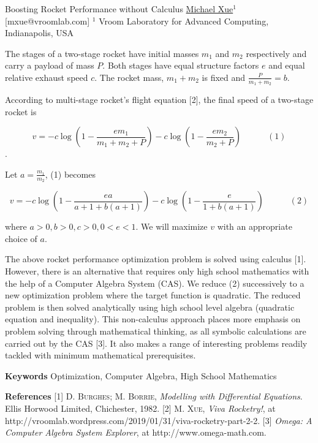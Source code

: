 


\begin{abstract_online}{Boosting Rocket Performance without Calculus}{%
        \underline{Michael Xue}$^{1}$}{[mxue@vroomlab.com]
        }{%
        $^1$ Vroom Laboratory for Advanced Computing, Indianapolis, USA\newline{}}
    
The stages of a two-stage rocket have initial masses $m_1$ and $m_2$ respectively and carry a payload
of mass $P$. Both stages have equal structure factors $e$ and equal relative exhaust speed $c$. 
The rocket mass, $m_1 + m_2$ is fixed and $\frac{P}{m_1+m_2}=b$.

According to multi-stage rocket's flight equation [2], the final speed of a two-stage rocket is

\[v=-c\log(1-\frac{em_1}{m_1+m_2+P})-c\log(1-\frac{em_2}{m_2+P})\quad\quad\quad(1)\].

Let $a=\frac{m_1}{m_2}$, (1) becomes

\[v = -c \log(1-\frac{ea}{a+1+b(a+1)})-c \log(1-\frac{e}{1+b(a+1)})\quad\quad\quad(2)\] 

where $a>0, b>0, c>0, 0<e<1$. We will maximize $v$ with an appropriate choice of $a$. \newline{}

The above rocket performance optimization problem is solved using calculus [1]. 
However, there is an alternative that requires only high school mathematics with the help of a 
Computer Algebra System (CAS). We reduce (2) successively to a new optimization problem 
where the target function is quadratic. The reduced problem is then solved analytically using 
high school level algebra (quadratic equation and inequality). This non-calculus approach places 
more emphasis on problem solving through mathematical thinking, as all symbolic calculations are 
carried out by the CAS [3]. It also makes a range of interesting problems readily tackled with 
minimum mathematical prerequisites.

\textbf{Keywords} \newline{} Optimization, Computer Algebra, High School Mathematics

\textbf{References} \newline{}
[1] \textsc{D. Burghes; M. Borrie}, \emph{Modelling with Differential Equations}. Ellis Horwood Limited, Chichester, 1982. \newline{}
[2] \textsc{M. Xue}, \emph{Viva Rocketry!}, at http://vroomlab.wordpress.com/2019/01/31/viva-rocketry-part-2-2. \newline{}
[3] \emph{Omega: A Computer Algebra System Explorer}, at http://www.omega-math.com. \newline{}
    
\end{abstract_online}
